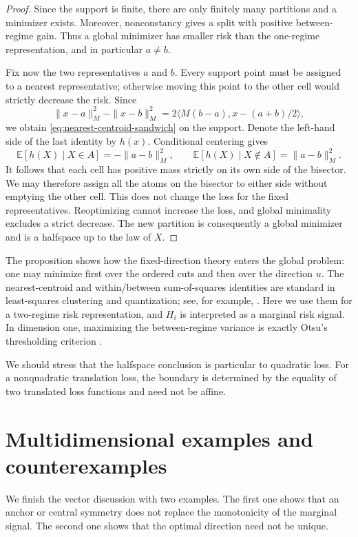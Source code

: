 \documentclass[a4paper]{amsart}
\numberwithin{equation}{section}
\theoremstyle{remark}
\newcommand{\E}{\mathbb E}
\newcommand{\1}{\mathbf 1}
\begin{document}
\begin{proof}
Since the support is finite, there are only finitely many partitions and a
minimizer exists.  Moreover, nonconstancy gives a split with positive
between-regime gain.  Thus a global minimizer has smaller risk than the
one-regime representation, and in particular $a\neq b$.

Fix now the two representatives $a$ and $b$.  Every support point must be
assigned to a nearest representative; otherwise moving this point to the
other cell would strictly decrease the risk.  Since
\[
  \|x-a\|_M^2-\|x-b\|_M^2
  =2\langle M(b-a),x-(a+b)/2\rangle,
\]
we obtain \eqref{eq:nearest-centroid-sandwich} on the support.  Denote the
left-hand side of the last identity by $h(x)$.  Conditional centering gives
\[
 \E[h(X)\mid X\in A]=-\|a-b\|_M^2,
 \qquad
 \E[h(X)\mid X\notin A]=\|a-b\|_M^2.
\]
It follows that each cell has positive mass strictly on its own side of the
bisector.  We may therefore assign all the atoms on the bisector to either
side without emptying the other cell.  This does not change the loss for the
fixed representatives.  Reoptimizing cannot increase the loss, and global
minimality excludes a strict decrease.  The new partition is consequently a
global minimizer and is a halfspace up to the law of $X$.
\end{proof}

The proposition shows how the fixed-direction theory enters the global
problem: one may minimize first over the ordered cuts and then over the
direction $u$.  The nearest-centroid and within/between sum-of-squares
identities are standard in least-squares clustering and quantization; see, for
example,
\cite{du-faber-gunzburger,muresan-effros}.
Here we use them for a two-regime risk representation, and $H_i$ is interpreted
as a marginal risk signal.  In dimension one, maximizing the between-regime
variance is exactly Otsu's thresholding criterion \cite{otsu}.

We should stress that the halfspace conclusion is particular to quadratic
loss.  For a nonquadratic translation loss, the boundary is determined by the
equality of two translated loss functions and need not be affine.


\section{Multidimensional examples and counterexamples}
\label{sec:vector-examples}

We finish the vector discussion with two examples.  The first one shows that
an anchor or central symmetry does not replace the monotonicity of the
marginal signal.  The second one shows that the optimal direction need not be
unique.
\end{document}

